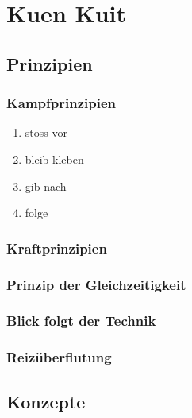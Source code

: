 
\renewcommand\chapterillustration{buddha_statue}
\chapter{Kuen Kuit}



\section{Prinzipien}


\subsection{Kampfprinzipien}

\begin{enumerate}
	\item stoss vor
	\item bleib kleben
	\item gib nach
	\item folge
\end{enumerate}

\subsection{Kraftprinzipien}

\subsection{Prinzip der Gleichzeitigkeit}

\subsection{Blick folgt der Technik}


\subsection{Reiz\"uberflutung}


\section{Konzepte}

